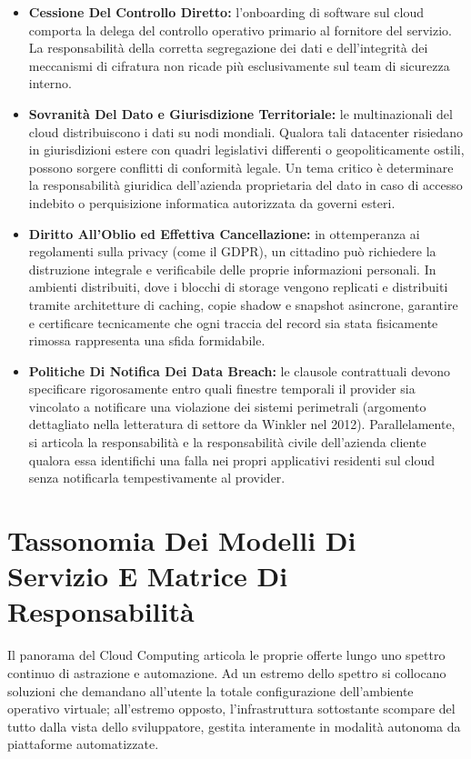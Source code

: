 \documentclass[11pt, a4paper]{article}
\begin{document}
\begin{itemize}
    \item \textbf{Cessione Del Controllo Diretto:} l'onboarding di software sul cloud comporta la delega del controllo operativo primario al fornitore del servizio. La responsabilità della corretta segregazione dei dati e dell'integrità dei meccanismi di cifratura non ricade più esclusivamente sul team di sicurezza interno.
    \item \textbf{Sovranità Del Dato e Giurisdizione Territoriale:} le multinazionali del cloud distribuiscono i dati su nodi mondiali. Qualora tali datacenter risiedano in giurisdizioni estere con quadri legislativi differenti o geopoliticamente ostili, possono sorgere conflitti di conformità legale. Un tema critico è determinare la responsabilità giuridica dell'azienda proprietaria del dato in caso di accesso indebito o perquisizione informatica autorizzata da governi esteri.
    \item \textbf{Diritto All'Oblio ed Effettiva Cancellazione:} in ottemperanza ai regolamenti sulla privacy (come il GDPR), un cittadino può richiedere la distruzione integrale e verificabile delle proprie informazioni personali. In ambienti distribuiti, dove i blocchi di storage vengono replicati e distribuiti tramite architetture di caching, copie shadow e snapshot asincrone, garantire e certificare tecnicamente che ogni traccia del record sia stata fisicamente rimossa rappresenta una sfida formidabile.
    \item \textbf{Politiche Di Notifica Dei Data Breach:} le clausole contrattuali devono specificare rigorosamente entro quali finestre temporali il provider sia vincolato a notificare una violazione dei sistemi perimetrali (argomento dettagliato nella letteratura di settore da Winkler nel 2012). Parallelamente, si articola la responsabilità e la responsabilità civile dell'azienda cliente qualora essa identifichi una falla nei propri applicativi residenti sul cloud senza notificarla tempestivamente al provider.
\end{itemize}

\newpage

\section{Tassonomia Dei Modelli Di Servizio E Matrice Di Responsabilità}

Il panorama del Cloud Computing articola le proprie offerte lungo uno spettro continuo di astrazione e automazione. Ad un estremo dello spettro si collocano soluzioni che demandano all'utente la totale configurazione dell'ambiente operativo virtuale; all'estremo opposto, l'infrastruttura sottostante scompare del tutto dalla vista dello sviluppatore, gestita interamente in modalità autonoma da piattaforme automatizzate.
\end{document}
